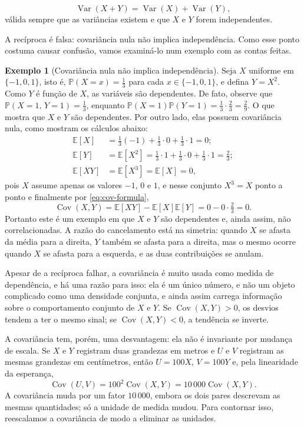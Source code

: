 \documentclass[12pt,portuguese]{article}
\theoremstyle{definition}
\newtheorem{example}[example]{Exemplo}
\theoremstyle{plainexercise}
\theoremstyle{starredexercise}
\theoremstyle{definition}
\begin{document}
\begin{equation}\label{eq:variancia-soma-independentes}
\operatorname{Var}(X+Y)=\operatorname{Var}(X)+\operatorname{Var}(Y),
\end{equation}
válida sempre que as variâncias existem e que $X$ e $Y$ forem independentes. 


\bigskip 
A recíproca é falsa: covariância nula não implica independência. Como esse
ponto costuma causar confusão, vamos examiná-lo num exemplo com as contas
feitas.

\begin{example}[Covariância nula não implica independência]\label{ex:cov-nula}
Seja $X$ uniforme em $\{-1,0,1\}$, isto é, $\mathbb{P}(X=x)=\tfrac13$ para cada
$x\in\{-1,0,1\}$, e defina $Y=X^2$. Como $Y$ é função de $X$, as variáveis são
dependentes. De fato, observe que  $\mathbb{P}(X=1,\,Y=1)=\tfrac13$, enquanto
$\mathbb{P}(X=1)\mathbb{P}(Y=1)=\tfrac13\cdot\tfrac23=\tfrac29$. O que mostra
que $X$ e $Y$ são dependentes. Por outro lado, elas possuem covariância nula,
como mostram os cálculos abaixo:
\begin{align*}
\mathbb{E}[X] &= \tfrac13(-1)+\tfrac13\cdot 0+\tfrac13\cdot 1=0;
\\[0.2cm]
\mathbb{E}[Y] &= \mathbb{E}[X^2]
= \tfrac13\cdot 1+\tfrac13\cdot 0+\tfrac13\cdot 1=\tfrac23;
\\[0.2cm]
\mathbb{E}[XY] &= \mathbb{E}[X^3]=\mathbb{E}[X]=0,
\end{align*}
pois $X$ assume apenas os valores $-1$, $0$ e $1$, e nesse conjunto $X^3=X$
ponto a ponto e finalmente por \eqref{eq:cov-formula},
\[
\operatorname{Cov}(X,Y)=\mathbb{E}[XY]-\mathbb{E}[X]\mathbb{E}[Y]
=0-0\cdot\tfrac23=0.
\]
Portanto este é um exemplo em que $X$ e $Y$ são dependentes e, ainda assim, não correlacionadas.
A razão do cancelamento está na simetria: quando $X$ se afasta da média para a
direita, $Y$ também se afasta para a direita, mas o mesmo ocorre quando $X$ se
afasta para a esquerda, e as duas contribuições se anulam.
\end{example}

Apesar de a recíproca falhar, a covariância é muito usada como medida de
dependência, e há uma razão para isso: ela é um único número, e não um objeto
complicado como uma densidade conjunta, e ainda assim carrega informação sobre
o comportamento conjunto de $X$ e $Y$. Se $\operatorname{Cov}(X,Y)>0$, os
desvios tendem a ter o mesmo sinal; se $\operatorname{Cov}(X,Y)<0$, a
tendência se inverte.

A covariância tem, porém, uma desvantagem: ela não é invariante por mudança de
escala. Se $X$ e $Y$ registram duas grandezas em metros e $U$ e $V$ registram
as mesmas grandezas em centímetros, então $U=100X$, $V=100Y$ e, pela
linearidade da esperança,
\[
\operatorname{Cov}(U,V)=100^2\operatorname{Cov}(X,Y)
=10\,000\operatorname{Cov}(X,Y).
\]
A covariância muda por um fator $10\,000$, embora os dois pares descrevam as
mesmas quantidades; só a unidade de medida mudou. Para contornar isso,
reescalamos a covariância de modo a eliminar as unidades.
\end{document}
